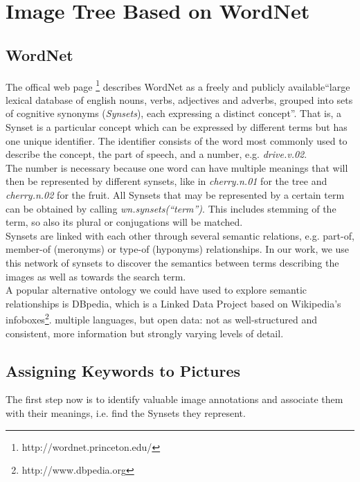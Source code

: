 %
\section{Image Tree Based on WordNet}
\label{sec_wordnetsearchtree}


\subsection{WordNet}
\label{sec_wordnet}
The offical web page \footnote{http://wordnet.princeton.edu/} describes WordNet as a freely and publicly available``large lexical database of english nouns, verbs, adjectives and adverbs, grouped into sets of cognitive synonyms (\emph{Synsets}), each expressing a distinct concept''. That is, a Synset is a particular concept which can be expressed by different terms but has one unique identifier. The identifier consists of the word most commonly used to describe the concept, the part of speech, and a number, e.g. \emph{drive.v.02}.\\
The number is necessary because one word can have multiple meanings that will then be represented by different synsets, like in \emph{cherry.n.01} for the tree and \emph{cherry.n.02} for the fruit. All Synsets that may be represented by a certain term can be obtained by calling \emph{wn.synsets(``term'')}. This includes stemming of the term, so also its plural or conjugations will be matched.\\

Synsets are linked with each other through several semantic relations, e.g. part-of, member-of (meronyms) or type-of (hyponyms) relationships.
In our work, we use this network of synsets to discover the semantics between terms describing the images as well as towards the search term. \\

A popular alternative ontology we could have used to explore semantic relationships is DBpedia, which is a Linked Data Project based on Wikipedia's infoboxes\footnote{http://www.dbpedia.org}. 
multiple languages, but open data: not as well-structured and consistent, more information but strongly varying levels of detail.
  
  
\subsection{Assigning Keywords to Pictures}
\label{sec_keywordstopictures}
The first step now is to identify valuable image annotations and associate them with their meanings, i.e. find the Synsets they represent.

